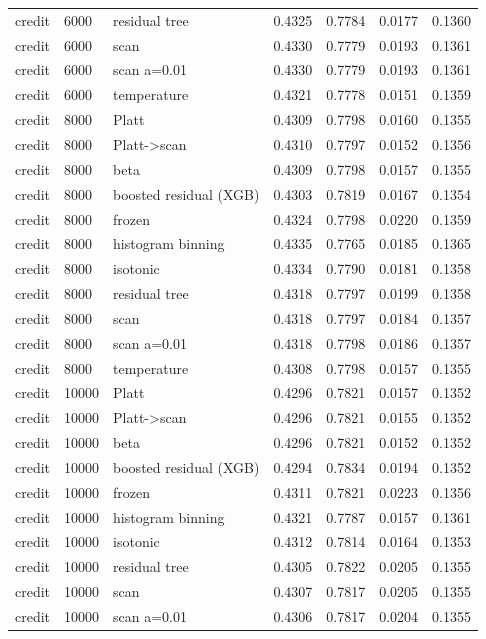 \begin{tabular}{lllrrrr}
credit & 6000 & residual tree & 0.4325 & 0.7784 & 0.0177 & 0.1360 \\
credit & 6000 & scan & 0.4330 & 0.7779 & 0.0193 & 0.1361 \\
credit & 6000 & scan a=0.01 & 0.4330 & 0.7779 & 0.0193 & 0.1361 \\
credit & 6000 & temperature & 0.4321 & 0.7778 & 0.0151 & 0.1359 \\
credit & 8000 & Platt & 0.4309 & 0.7798 & 0.0160 & 0.1355 \\
credit & 8000 & Platt->scan & 0.4310 & 0.7797 & 0.0152 & 0.1356 \\
credit & 8000 & beta & 0.4309 & 0.7798 & 0.0157 & 0.1355 \\
credit & 8000 & boosted residual (XGB) & 0.4303 & 0.7819 & 0.0167 & 0.1354 \\
credit & 8000 & frozen & 0.4324 & 0.7798 & 0.0220 & 0.1359 \\
credit & 8000 & histogram binning & 0.4335 & 0.7765 & 0.0185 & 0.1365 \\
credit & 8000 & isotonic & 0.4334 & 0.7790 & 0.0181 & 0.1358 \\
credit & 8000 & residual tree & 0.4318 & 0.7797 & 0.0199 & 0.1358 \\
credit & 8000 & scan & 0.4318 & 0.7797 & 0.0184 & 0.1357 \\
credit & 8000 & scan a=0.01 & 0.4318 & 0.7798 & 0.0186 & 0.1357 \\
credit & 8000 & temperature & 0.4308 & 0.7798 & 0.0157 & 0.1355 \\
credit & 10000 & Platt & 0.4296 & 0.7821 & 0.0157 & 0.1352 \\
credit & 10000 & Platt->scan & 0.4296 & 0.7821 & 0.0155 & 0.1352 \\
credit & 10000 & beta & 0.4296 & 0.7821 & 0.0152 & 0.1352 \\
credit & 10000 & boosted residual (XGB) & 0.4294 & 0.7834 & 0.0194 & 0.1352 \\
credit & 10000 & frozen & 0.4311 & 0.7821 & 0.0223 & 0.1356 \\
credit & 10000 & histogram binning & 0.4321 & 0.7787 & 0.0157 & 0.1361 \\
credit & 10000 & isotonic & 0.4312 & 0.7814 & 0.0164 & 0.1353 \\
credit & 10000 & residual tree & 0.4305 & 0.7822 & 0.0205 & 0.1355 \\
credit & 10000 & scan & 0.4307 & 0.7817 & 0.0205 & 0.1355 \\
credit & 10000 & scan a=0.01 & 0.4306 & 0.7817 & 0.0204 & 0.1355 \\

\end{tabular}
